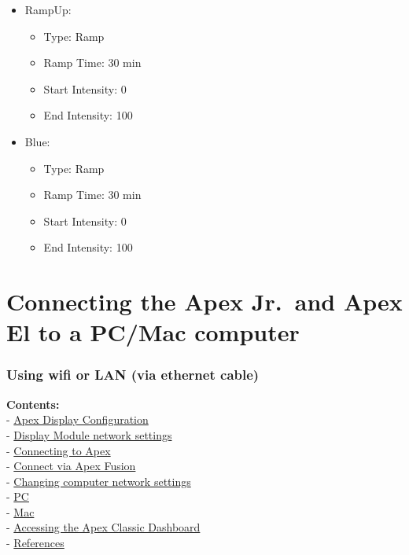 \documentclass[
]{book}
\providecommand{\tightlist}{%
  \setlength{\itemsep}{0pt}\setlength{\parskip}{0pt}}
\begin{document}
\begin{itemize}
\tightlist
\item
  RampUp:

  \begin{itemize}
  \tightlist
  \item
    Type: Ramp
  \item
    Ramp Time: 30 min
  \item
    Start Intensity: 0
  \item
    End Intensity: 100
  \end{itemize}
\item
  Blue:

  \begin{itemize}
  \tightlist
  \item
    Type: Ramp
  \item
    Ramp Time: 30 min
  \item
    Start Intensity: 0
  \item
    End Intensity: 100
  \end{itemize}
\end{itemize}

\hypertarget{connecting-the-apex-jr.-and-apex-el-to-a-pcmac-computer}{%
\chapter{Connecting the Apex Jr.~and Apex El to a PC/Mac computer}\label{connecting-the-apex-jr.-and-apex-el-to-a-pcmac-computer}}

\hypertarget{using-wifi-or-lan-via-ethernet-cable}{%
\subsection{Using wifi or LAN (via ethernet cable)}\label{using-wifi-or-lan-via-ethernet-cable}}

\textbf{Contents:}\\
- \protect\hyperlink{apex_display_configuration}{Apex Display Configuration}\\
- \protect\hyperlink{display_module_network_settings}{Display Module network settings}\\
- \protect\hyperlink{connect_apex}{Connecting to Apex}\\
- \protect\hyperlink{apex_fusion_link}{Connect via Apex Fusion}\\
- \protect\hyperlink{network_settings}{Changing computer network settings}\\
- \protect\hyperlink{pc}{PC}\\
- \protect\hyperlink{mac}{Mac}\\
- \protect\hyperlink{apex_classic_dashboard}{Accessing the Apex Classic Dashboard}\\
- \protect\hyperlink{references}{References}
\end{document}

